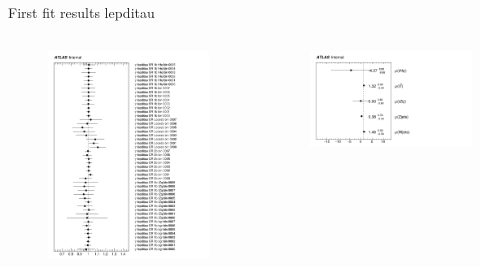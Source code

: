 \begin{frame}{First fit results lepditau}
    \begin{columns}
        \begin{column}{0.5\textwidth}
            \begin{figure}
                \centering
                \includegraphics[width=\textwidth]{asimov_hadhad}
            \end{figure}
        \end{column}
        \begin{column}{0.5\textwidth}
            \begin{figure}
                \centering
                \includegraphics[width=\textwidth]{fit_hadhad}

\end{figure}
\end{column}
\end{columns}
\end{frame}
